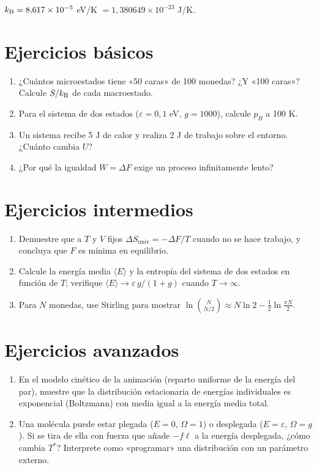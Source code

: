 \documentclass[11pt,a4paper]{article}
\begin{document}
$k_{\mathrm B}=8{,}617\times10^{-5}$ eV/K $=1{,}380649\times10^{-23}$ J/K.

\section{Ejercicios básicos}
\begin{enumerate}[label=\textbf{B\arabic*.}]
\item ¿Cuántos microestados tiene «50 caras» de 100 monedas? ¿Y «100 caras»? Calcule $S/k_{\mathrm B}$ de cada macroestado.
\item Para el sistema de dos estados ($\varepsilon=0{,}1$ eV, $g=1000$), calcule $p_B$ a 100 K.
\item Un sistema recibe 5 J de calor y realiza 2 J de trabajo sobre el entorno. ¿Cuánto cambia $U$?
\item ¿Por qué la igualdad $W=\Delta F$ exige un proceso infinitamente lento?
\end{enumerate}

\section{Ejercicios intermedios}
\begin{enumerate}[label=\textbf{I\arabic*.}]
\item Demuestre que a $T$ y $V$ fijos $\Delta S_{\text{univ}}=-\Delta F/T$ cuando no se hace trabajo, y concluya que $F$ es mínima en equilibrio.
\item Calcule la energía media $\langle E\rangle$ y la entropía del sistema de dos estados en función de $T$; verifique $\langle E\rangle\to\varepsilon\,g/(1+g)$ cuando $T\to\infty$.
\item Para $N$ monedas, use Stirling para mostrar $\ln\binom{N}{N/2}\approx N\ln2-\frac12\ln\frac{\pi N}{2}$.
\end{enumerate}

\section{Ejercicios avanzados}
\begin{enumerate}[label=\textbf{A\arabic*.}]
\item En el modelo cinético de la animación (reparto uniforme de la energía del par), muestre que la distribución estacionaria de energías individuales es exponencial (Boltzmann) con media igual a la energía media total.
\item Una molécula puede estar plegada ($E=0$, $\Omega=1$) o desplegada ($E=\varepsilon$, $\Omega=g$). Si se tira de ella con fuerza que añade $-f\ell$ a la energía desplegada, ¿cómo cambia $T^*$? Interprete como «programar» una distribución con un parámetro externo.
\end{enumerate}
\end{document}
